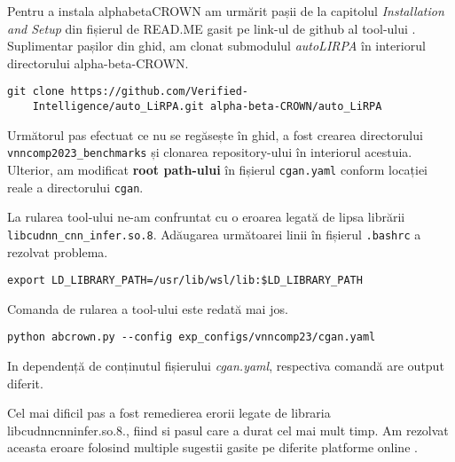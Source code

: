 Pentru a instala alpha\textunderscore beta\textunderscore CROWN am urmărit pașii de la capitolul \textit{Installation and Setup} din fișierul de READ.ME gasit pe link-ul de github al tool-ului \cite{read_abc.md}. 
Suplimentar pașilor din ghid, am clonat submodulul \textit{auto\textunderscore LIRPA} în interiorul directorului alpha-beta-CROWN. 
    \begin{lstlisting}[style=bashstyle]
    git clone https://github.com/Verified-
    Intelligence/auto_LiRPA.git alpha-beta-CROWN/auto_LiRPA
   \end{lstlisting}

Următorul pas efectuat ce nu se regăsește în ghid, a fost crearea directorului \texttt{vnncomp2023\_benchmarks} și clonarea repository-ului \cite{cganrepository} în interiorul acestuia. Ulterior, am modificat \textbf{root path-ului} în fișierul \texttt{cgan.yaml} conform locației reale a directorului \texttt{cgan}.

La rularea tool-ului ne-am confruntat cu o eroarea legată de lipsa librării \texttt{libcudnn\_cnn\_infer.so.8}. Adăugarea următoarei linii în fișierul \texttt{.bashrc} a rezolvat problema.
  \begin{lstlisting}[style=bashstyle]
    export LD_LIBRARY_PATH=/usr/lib/wsl/lib:$LD_LIBRARY_PATH
  \end{lstlisting}
  
Comanda de rularea a tool-ului este redată mai jos.
  \begin{lstlisting}[style=bashstyle]
    python abcrown.py --config exp_configs/vnncomp23/cgan.yaml
  \end{lstlisting}
In dependență de conținutul fișierului \textit{cgan.yaml}, respectiva comandă are output diferit.

Cel mai dificil pas a fost remedierea erorii legate de libraria libcudnn\textunderscore cnn\textunderscore infer.so.8., fiind si pasul care a durat cel mai mult timp. Am rezolvat aceasta eroare folosind multiple sugestii gasite pe diferite platforme online \cite{bashrcfix}.